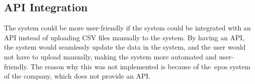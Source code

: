 \subsection{API Integration}\label{subsec:api-integration}

The system could be more user-friendly if the system could be integrated with an API instead of uploading CSV files
manually to the system.
By having an API, the system would seamlessly update the data in the system, and the user would not have to upload
manually, making the system more automated and user-friendly.
The reason why this was not implemented is because of the~\acrshort{epos} system of the company, which does not provide
an API\@.
